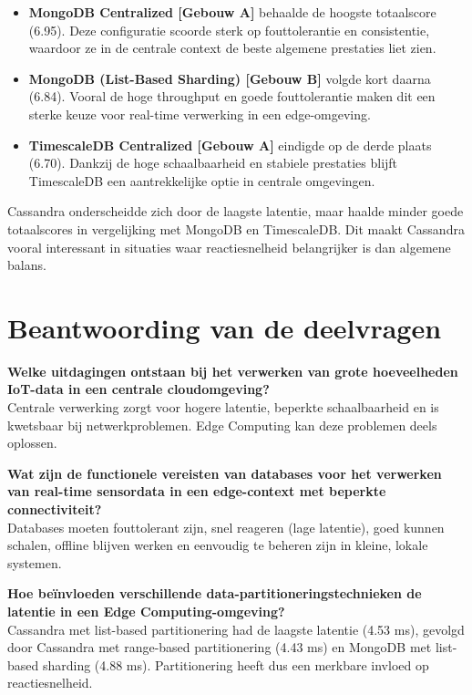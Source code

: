 \begin{itemize}
    \item \textbf{MongoDB Centralized [Gebouw A]} behaalde de hoogste totaalscore (6.95). Deze configuratie scoorde sterk op fouttolerantie en consistentie, waardoor ze in de centrale context de beste algemene prestaties liet zien.
    \item \textbf{MongoDB (List-Based Sharding) [Gebouw B]} volgde kort daarna (6.84). Vooral de hoge throughput en goede fouttolerantie maken dit een sterke keuze voor real-time verwerking in een edge-omgeving.
    \item \textbf{TimescaleDB Centralized [Gebouw A]} eindigde op de derde plaats (6.70). Dankzij de hoge schaalbaarheid en stabiele prestaties blijft TimescaleDB een aantrekkelijke optie in centrale omgevingen.
\end{itemize}

Cassandra onderscheidde zich door de laagste latentie, maar haalde minder goede totaalscores in vergelijking met MongoDB en TimescaleDB. Dit maakt Cassandra vooral interessant in situaties waar reactiesnelheid belangrijker is dan algemene balans.

\section{Beantwoording van de deelvragen}

\textbf{Welke uitdagingen ontstaan bij het verwerken van grote hoeveelheden IoT-data in een centrale cloudomgeving?} \\  
Centrale verwerking zorgt voor hogere latentie, beperkte schaalbaarheid en is kwetsbaar bij netwerkproblemen. Edge Computing kan deze problemen deels oplossen.

\textbf{Wat zijn de functionele vereisten van databases voor het verwerken van real-time sensordata in een edge-context met beperkte connectiviteit?} \\  
Databases moeten fouttolerant zijn, snel reageren (lage latentie), goed kunnen schalen, offline blijven werken en eenvoudig te beheren zijn in kleine, lokale systemen.

\textbf{Hoe beïnvloeden verschillende data-partitioneringstechnieken de latentie in een Edge Computing-omgeving?} \\  
Cassandra met list-based partitionering had de laagste latentie (4.53 ms), gevolgd door Cassandra met range-based partitionering (4.43 ms) en MongoDB met list-based sharding (4.88 ms). Partitionering heeft dus een merkbare invloed op reactiesnelheid.

